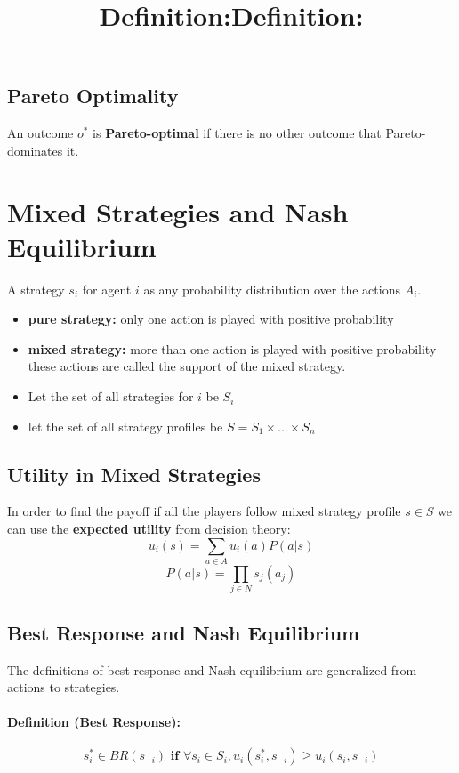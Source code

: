 \subsection{Pareto Optimality}
\title{\textbf{Definition:}}
An outcome $o^*$ is \textbf{Pareto-optimal} if there is no other outcome that Pareto-dominates it.
\section{Mixed Strategies and Nash Equilibrium}
\title{\textbf{Definition:}}
A strategy $s_i$ for agent $i$ as any probability distribution over the actions $A_i$.
\begin{itemize}
\item \textbf{pure strategy:} only one action is played with positive probability
\item \textbf{mixed strategy:} more than one action is played with positive probability
\bigbreak
these actions are called the support of the mixed strategy.
\item Let the set of all strategies for $i$ be $S_i$
\item let the set of all strategy profiles be $S = S_1 \times... \times S_n$
\end{itemize}
\subsection{Utility in Mixed Strategies}
In order to find the payoff if all the players follow mixed strategy profile $s \in S$ we can use the \textbf{expected utility} from decision theory: 
\begin{equation} u_i(s) = \sum_{a \in A}u_i(a)P(a|s)\end{equation}
\begin{equation} P(a|s) = \prod_{j \in N}s_j(a_j)\end{equation}
\subsection{Best Response and Nash Equilibrium}The definitions of best response and Nash equilibrium are generalized from actions to strategies. 

\paragraph{Definition (Best Response): }
$$ s_i^* \in BR(s_{-i}) \textbf{ if }   \forall s_i \in S_i, u_i(s_i^*,s_{-i}) \geq u_i(s_i, s_{-i})$$ 

